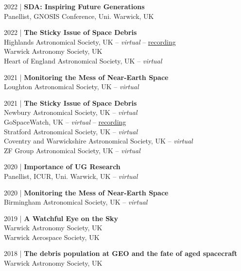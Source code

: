 \documentclass[10pt,a4paper]{altacv}
\begin{document}
\smallskip

\small 2022 | \textbf{SDA: Inspiring Future Generations} \\
Panellist, GNOSIS Conference, Uni. Warwick, UK

\smallskip

\small 2022 | \textbf{The Sticky Issue of Space Debris} \\
Highlands Astronomical Society, UK -- \textit{virtual} -- \href{https://youtu.be/WMC-LWQ0q7o}{recording} \\
Warwick Astronomy Society, UK \\
Heart of England Astronomical Society, UK -- \textit{virtual}

\smallskip

\small 2021 | \textbf{Monitoring the Mess of Near-Earth Space} \\
Loughton Astronomical Society, UK -- \textit{virtual}

\smallskip

\small 2021 | \textbf{The Sticky Issue of Space Debris} \\
Newbury Astronomical Society, UK -- \textit{virtual} \\
GoSpaceWatch, UK -- \textit{virtual} -- \href{https://youtu.be/wAq95oAaCMI?si=AYPChm5JbJ4IdLt3}{recording} \\
Stratford Astronomical Society, UK -- \textit{virtual} \\
Coventry and Warwickshire Astronomical Society, UK -- \textit{virtual} \\
ZF Group Astronomical Society, UK -- \textit{virtual}

\smallskip

\small 2020 | \textbf{Importance of UG Research} \\
Panellist, ICUR, Uni. Warwick, UK -- \textit{virtual}

\smallskip

\small 2020 | \textbf{Monitoring the Mess of Near-Earth Space} \\
Birmingham Astronomical Society, UK -- \textit{virtual}

\smallskip

\small 2019 | \textbf{A Watchful Eye on the Sky} \\
Warwick Astronomy Society, UK \\
Warwick Aerospace Society, UK 

\smallskip

\small 2018 | \textbf{The debris population at GEO and the fate of aged spacecraft} \\
Warwick Astronomy Society, UK
\end{document}
